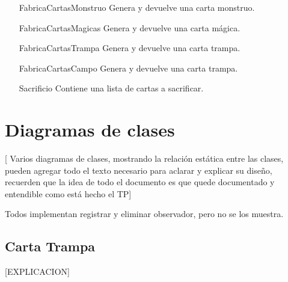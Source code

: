 \begin{itemize}
\item[FabricaCartasMonstruo] Genera y devuelve una carta monstruo.

\item[FabricaCartasMagicas] Genera y devuelve una carta mágica.

\item[FabricaCartasTrampa] Genera y devuelve una carta trampa.

\item[FabricaCartasCampo] Genera y devuelve una carta trampa.

\item[Sacrificio] Contiene una lista de cartas a sacrificar.

\end{itemize}


\clearpage
\section{Diagramas de clases}

[ Varios diagramas de clases, mostrando la relación estática entre las
clases, pueden agregar todo el texto necesario para aclarar y explicar su
diseño, recuerden que la idea de todo el documento es que quede
documentado y entendible como está hecho el TP]

Todos implementan registrar y eliminar observador, pero no se los muestra.

\subsection{Carta Trampa}

[EXPLICACION]

